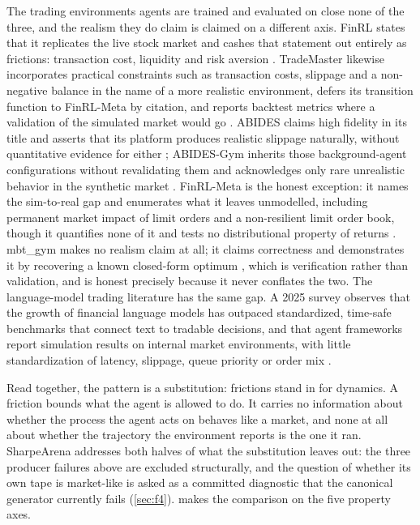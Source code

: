 The trading environments agents are trained and evaluated on close none of the three, and the realism they do claim is claimed on a different axis. FinRL states that it replicates the live stock market and cashes that statement out entirely as frictions: transaction cost, liquidity and risk aversion \citep{liu2020finrl}. TradeMaster likewise incorporates practical constraints such as transaction costs, slippage and a non-negative balance in the name of a more realistic environment, defers its transition function to FinRL-Meta by citation, and reports backtest metrics where a validation of the simulated market would go \citep{sun2023trademaster}. ABIDES claims high fidelity in its title and asserts that its platform produces realistic slippage naturally, without quantitative evidence for either \citep{byrd2020abides}; ABIDES-Gym inherits those background-agent configurations without revalidating them and acknowledges only rare unrealistic behavior in the synthetic market \citep{amrouni2021abidesgym}. FinRL-Meta is the honest exception: it names the sim-to-real gap and enumerates what it leaves unmodelled, including permanent market impact of limit orders and a non-resilient limit order book, though it quantifies none of it and tests no distributional property of returns \citep{liu2022finrlmeta}. mbt\_gym makes no realism claim at all; it claims correctness and demonstrates it by recovering a known closed-form optimum \citep{jerome2023mbtgym}, which is verification rather than validation, and is honest precisely because it never conflates the two. The language-model trading literature has the same gap. A 2025 survey observes that the growth of financial language models has outpaced standardized, time-safe benchmarks that connect text to tradable decisions, and that agent frameworks report simulation results on internal market environments, with little standardization of latency, slippage, queue priority or order mix \citep[pp.~11--12]{fu2025newquant}.

Read together, the pattern is a substitution: frictions stand in for dynamics. A friction bounds what the agent is allowed to do. It carries no information about whether the process the agent acts on behaves like a market, and none at all about whether the trajectory the environment reports is the one it ran. SharpeArena addresses both halves of what the substitution leaves out: the three producer failures above are excluded structurally, and the question of whether its own tape is market-like is asked as a committed diagnostic that the canonical generator currently fails (\cref{sec:f4}).  makes the comparison on the five property axes.

